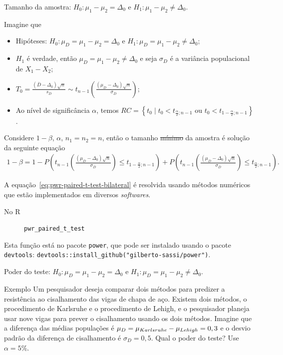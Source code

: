 \documentclass[9pt]{beamer}
\begin{document}
\begin{frame}[fragile]{Tamanho da amostra: $H_0:\mu_1 - \mu_2 = \Delta_0$ e $H_1: \mu_1 - \mu_2 \neq \Delta_0$.}

\scriptsize
Imagine que
\begin{itemize}
	\item Hipóteses: $H_0:\mu_D= \mu_1 - \mu_2 = \Delta_0$ e $H_1:\mu_D= \mu_1 -  \mu_2 \neq \Delta_0$;
	\item $H_1$ é verdade, então $\mu_D = \mu_1-\mu_2 \neq \Delta_0$ e seja $\sigma_D$ é a variância populacional de $X_1 - X_2$;
	\item $T_0 = \frac{(\bar{D} - \Delta_0)\sqrt{n}}{s_D} \sim t_{n-1}\left( \frac{(\mu_D - \Delta_0)\sqrt{n}}{\sigma_D} \right)$;
	\item Ao nível de significância $\alpha$, temos $RC = \left\{ t_0 \mid t_0 < t_{\frac{\alpha}{2};n-1} \mbox{ ou } t_0 < t_{1-\frac{\alpha}{2}; n-1} \right\}$.
\end{itemize}
\vfill

Considere $1-\beta$, $\alpha$, $n_1=n_2=n$, então o tamanho \sout{mínimo} da amostra é solução da seguinte equação
\scriptsize
\begin{align}\label{eq:pwr-paired-t-test-bilateral}
1-\beta = 1 - P\left( t_{n-1}\left( \frac{(\mu_D - \Delta_0)\sqrt{n}}{\sigma_D} \right) \leq t_{1-\frac{\alpha}{2};n-1} \right) + P\left( t_{n-1}\left( \frac{(\mu_D - \Delta_0)\sqrt{n}}{\sigma_D} \right) \leq t_{\frac{\alpha}{2};n-1} \right).
\end{align}
\normalsize

A equação~\eqref{eq:pwr-paired-t-test-bilateral} é resolvida usando métodos numéricos que estão implementados em diversos \textit{softwares}.
\begin{description}
	\item[No R] \lstinline|pwr_paired_t_test|
\end{description}
Esta função está no pacote \lstinline|power|, que pode ser instalado usando o pacote \lstinline|devtools|: \lstinline|devtools::install_github("gilberto-sassi/power")|.


\end{frame}

\begin{frame}{Poder do teste: $H_0:\mu_D = \mu_1 - \mu_2 = \Delta_0$ e $H_1:\mu_D =  \mu_1 - \mu_2 \neq \Delta_0$.}

\large
\begin{block}{Exemplo}
	Um pesquisador deseja comparar dois métodos para predizer a resistência ao cisalhamento das vigas de chapa de aço. Existem dois métodos, o procedimento de Karlsruhe e o procedimento de Lehigh, e o pesquisador planeja usar nove vigas para prever o cisalhamento usando os dois métodos. Imagine que a diferença das médias populações é $\mu_D = \mu_{\tiny Karlsruhe} - \mu_{\tiny Lehigh} = 0,3$ e o desvio padrão da diferença de cisalhamento é $\sigma_D = 0,5$. Qual o poder do teste? Use $\alpha=5\%$. 
\end{block}	
\normalsize

\end{frame}
\end{document}
